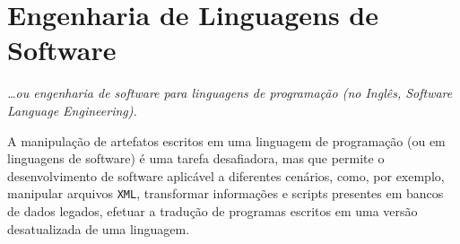 

\section{Engenharia de Linguagens de Software}\label{sec:softEng}


\begin{flushright}
\emph{
\ldots ou engenharia de software para linguagens de programa\c c\~{a}o 
(no Ingl\^{e}s, Software Language Engineering).}
\end{flushright}

A manipulaç\~{a}o de artefatos escritos em 
uma linguagem de programaç\~{a}o (ou em linguagens de software) 
\'{e} uma tarefa desafiadora, mas que permite o desenvolvimento 
de software aplic\'{a}vel a diferentes cen\'{a}rios, como, por exemplo, 
manipular arquivos \texttt{XML}, transformar 
informa\c c\~{o}es e scripts presentes 
em bancos de dados legados, efetuar a tradu\c c\~{a}o de programas 
escritos em uma vers\~{a}o desatualizada de uma linguagem. 

